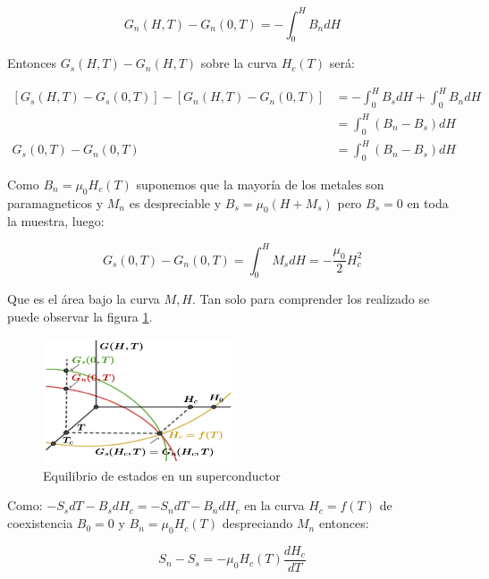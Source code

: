 \begin{equation*}
G_{n}(H, T)-G_{n}(0, T) = -\int_{0}^{H} B_{n}dH
\end{equation*}

Entonces $G_{s}(H, T)-G_{n}(H, T)$ sobre la curva $H_{c}(T)$ será:

\begin{equation}
\begin{aligned}
[G_{s}(H, T)-G_{s}(0, T)]-[G_{n}(H, T)-G_{n}(0, T)] & = -\int_{0}^{H} B_{s}dH+\int_{0}^{H} B_{n}dH \\ 
& = \int_{0}^{H} (B_{n}-B_{s})dH \\
G_{s}(0, T)-G_{n}(0, T) &= \int_{0}^{H} (B_{n}-B_{s})dH 
\end{aligned}
\end{equation}

Como $B_{n}=\mu_{0}H_{c}(T)$ suponemos que la mayoría de los metales son paramagneticos y $M_{n}$ es despreciable y $B_{s}=\mu_{0}(H+M_{s})$ pero $B_{s}=0$ en toda la muestra, luego:


\begin{equation}
G_{s}(0, T)-G_{n}(0, T) = \int_{0}^{H}M_{s}dH =- \frac{\mu_{0}}{2}H_{c}^{2}
\end{equation}

Que es el área bajo la curva $M,H$. Tan solo para comprender los realizado se puede observar la figura \ref{fig:426}.

\begin{figure}[H]
    \centering
    \includegraphics[width=0.5\textwidth]{./Figures/fig426}
	\caption{Equilibrio de estados en un superconductor}
	\label{fig:426}
\end{figure}


Como: $-S_{s}dT-B_{s}dH_{c}= -S_{n}dT-B_{n}dH_{c}$ en la curva $H_{c}=f(T)$ de coexistencia $B_{0}=0$ y $B_{n}=\mu_{0}H_{c}(T)$ despreciando $M_{n}$ entonces:

\begin{equation}
S_{n}-S_{s} = -\mu_{0} H_{c}(T) \frac{dH_{c}}{dT}
\end{equation}

